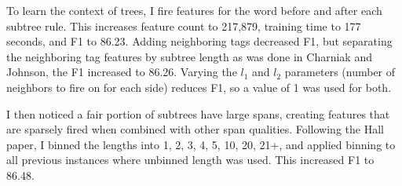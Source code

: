 \documentclass[11pt]{article}
\begin{document}
To learn the context of trees, I fire features for the word before and after each subtree rule.
This increases feature count to 217,879, training time to 177 seconds, and F1 to 86.23.
Adding neighboring tags decreased F1, but separating the neighboring tag features by subtree
length as was done in Charniak and Johnson, the F1 increased to 86.26. Varying the $l_1$ and $l_2$
parameters (number of neighbors to fire on for each side) reduces F1, so a value of 1 was used
for both.

I then noticed a fair portion of subtrees have large spans, creating features that are sparsely
fired when combined with other span qualities. Following the Hall paper, I binned the lengths
into 1, 2, 3, 4, 5, 10, 20, 21+, and applied binning to all previous instances where unbinned
length was used. This increased F1 to 86.48.
\end{document}
